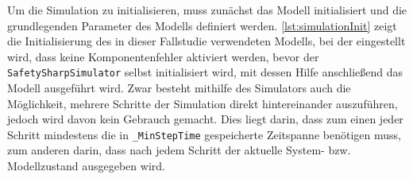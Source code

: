 Um die Simulation zu initialisieren, muss zunächst das Modell initialisiert und die grundlegenden Parameter des Modells definiert werden.
\autoref{lst:simulationInit} zeigt die Initialisierung des in dieser Fallstudie verwendeten Modells, bei der eingestellt wird, dass keine Komponentenfehler aktiviert werden, bevor der \texttt{SafetySharpSimulator} selbst initialisiert wird, mit dessen Hilfe anschließend das Modell ausgeführt wird.
Zwar besteht mithilfe des Simulators auch die Möglichkeit, mehrere Schritte der Simulation direkt hintereinander auszuführen, jedoch wird davon kein Gebrauch gemacht.
Dies liegt darin, dass zum einen jeder Schritt mindestens die in \texttt{\_MinStepTime} gespeicherte Zeitspanne benötigen muss, zum anderen darin, dass nach jedem Schritt der aktuelle System- bzw. Modellzustand ausgegeben wird.


